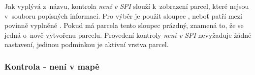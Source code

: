 Jak vyplývá z~názvu, kontrola \textit{není v SPI} slouží k~zobrazení parcel, které nejsou v~souboru popisných informací. Pro výběr je použit sloupec , neboť patří mezi povinně vyplněné \citep{struktura_vfk}. Pokud má parcela tento sloupec prázdný, znamená to, že se jedná o~nově vytvořenu parcelu. Provedení kontroly \textit{není v SPI} nevyžaduje žádné nastavení, jedinou podmínkou je aktivní vrstva parcel.

\subsubsection{Kontrola - není v mapě}
\label{kontrola_neni_v_mape}



